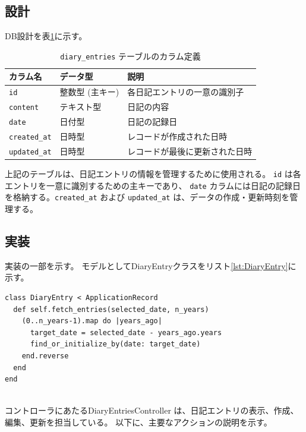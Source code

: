 \documentclass[dvipdfmx,fleqn,article]{jlreq}
\begin{document}
\subsection{設計}
DB設計を表\ref{tab:diary_entries}に示す。
\begin{table}[h]
    \centering
    \caption{\texttt{diary\_entries} テーブルのカラム定義}
    \label{tab:diary_entries}
    \begin{tabular}{|l|l|l|}
        \hline
        \textbf{カラム名} & \textbf{データ型} & \textbf{説明} \\ \hline
        \texttt{id} & 整数型 (主キー) & 各日記エントリの一意の識別子 \\ \hline
        \texttt{content} & テキスト型 & 日記の内容 \\ \hline
        \texttt{date} & 日付型 & 日記の記録日 \\ \hline
        \texttt{created\_at} & 日時型 & レコードが作成された日時 \\ \hline
        \texttt{updated\_at} & 日時型 & レコードが最後に更新された日時 \\ \hline
    \end{tabular}
\end{table}

\noindent
上記のテーブルは、日記エントリの情報を管理するために使用される。
\texttt{id} は各エントリを一意に識別するための主キーであり、
\texttt{date} カラムには日記の記録日を格納する。\texttt{created\_at}
 および \texttt{updated\_at} は、データの作成・更新時刻を管理する。



\subsection{実装}

実装の一部を示す。
モデルとしてDiaryEntryクラスをリスト\ref{lst:DiaryEntry}に示す。

\begin{lstlisting}[language=CSharp, caption=DiaryEntryクラス, label={lst:DiaryEntry}]
class DiaryEntry < ApplicationRecord
  def self.fetch_entries(selected_date, n_years)
    (0..n_years-1).map do |years_ago|
      target_date = selected_date - years_ago.years
      find_or_initialize_by(date: target_date)
    end.reverse
  end
end
  
\end{lstlisting}


コントローラにあたるDiaryEntriesController は、日記エントリの表示、作成、編集、更新を担当している。
以下に、主要なアクションの説明を示す。
\end{document}
